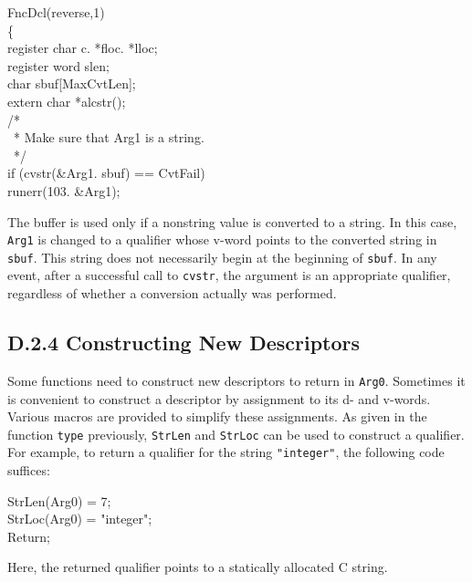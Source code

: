 \goodbreak
\begin{iconcode}
\color{red}FncDcl(reverse,1)\\
\{\\
\>register char c. *floc. *lloc;\\
\>register word slen;\\
\>char sbuf[MaxCvtLen];\\
\>extern char *alcstr();\\
\>/*\\
\>\ * Make sure that Arg1 is a string.\\
\>\ */\\
\>if (cvstr(\&Arg1. sbuf) == CvtFail)\\
\>\>runerr(103. \&Arg1);
\end{iconcode}

\noindent
The buffer is used only if a nonstring value is converted to a string. In this
case, \texttt{Arg1} is changed to a qualifier whose v-word points to the
converted string in \texttt{sbuf}. This string does not necessarily begin at the
beginning of \texttt{sbuf}. In any event, after a successful call to
\texttt{cvstr}, the argument is an appropriate qualifier, regardless of whether
a conversion actually was performed.

\subsection[D.2.4 Constructing New Descriptors]{D.2.4 Constructing New Descriptors}

Some functions need to construct new descriptors to return in \texttt{Arg0}.
Sometimes it is convenient to construct a descriptor by assignment to its d- and
v-words. Various macros are provided to simplify these assignments. As given in
the function \texttt{type} previously, \texttt{StrLen} and \texttt{StrLoc} can
be used to construct a qualifier. For example, to return a qualifier for the
string \texttt{"integer"}, the following code suffices:
\goodbreak
\begin{iconcode}
StrLen(Arg0) = 7;\\
StrLoc(Arg0) = "integer";\\
Return;
\end{iconcode}
\noindent
Here, the returned qualifier points to a statically allocated C string.

